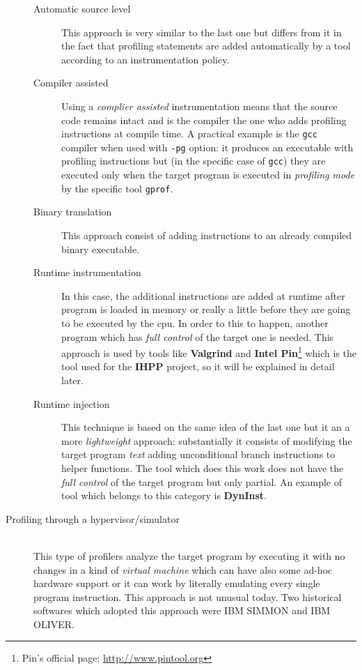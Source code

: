 \documentclass[a4paper,10pt]{report}
\begin{document}
\begin{description}
\begin{description}
\item[Automatic source level] This approach is very similar to the last one but
differs from it in the fact that profiling statements are added automatically by
a tool according to an instrumentation policy.

\item[Compiler assisted] Using a \emph{complier assisted} instrumentation means
that the source code remains intact and is the compiler the one who adds
profiling instructions at compile time. A practical example is the \verb|gcc| compiler when
used with \verb|-pg| option: it produces an executable with profiling
instructions but (in the specific case of \verb|gcc|) they are executed only when the
target program is executed in \emph{profiling mode} by the specific tool
\verb|gprof|.

\item[Binary translation]
This approach consist of adding instructions to an already compiled binary executable.

\item[Runtime instrumentation]
In this case, the additional instructions are added at runtime after program is
loaded in memory or really a little before they are going to be executed by the
cpu. In order to this to happen, another program which has \emph{full control}
of the target one is needed. This approach is used by tools like
\textbf{Valgrind} and \textbf{Intel Pin}\footnote{Pin's official page:
\url{http://www.pintool.org}} which is the tool used for the \textbf{IHPP}
project, so it will be explained in detail later.

\item[Runtime injection] This technique is based on the same idea of the last
one but it an a more \emph{lightweight} approach: substantially it consists of
modifying the target program \emph{text} adding unconditional branch
instructions to helper functions. The tool which does this work does not have the
\emph{full control} of the target program but only partial. An example of tool
which belongs to this category is \textbf{DynInst}.

\end{description} 

\item[Profiling through a hypervisor/simulator] \hfill \\
This type of profilers analyze the target program by executing it with no
changes in a kind of \emph{virtual machine} which can have also some ad-hoc
hardware support or it can work by literally emulating every single program
instruction. This approach is not unusual today. Two historical softwares
which adopted this approach were IBM SIMMON and IBM OLIVER.

\end{description}
\end{document}
